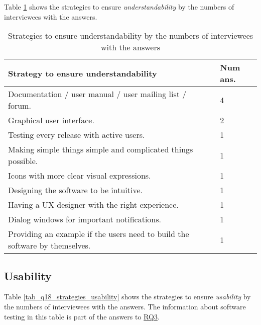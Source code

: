 Table \ref{tab_q17_strategies_understandability} shows the strategies to ensure \textit{understandability} by the numbers of interviewees with the answers.

\begin{table}[H]
\centering
\begin{tabular}{ll}
\hline
Strategy to ensure understandability & Num ans. \\ \hline
Documentation / user manual / user mailing list / forum. & 4 \\
Graphical user interface. & 2 \\
Testing every release with active users. & 1 \\
Making simple things simple and complicated things possible. & 1 \\
Icons with more clear visual expressions. & 1 \\
Designing the software to be intuitive. & 1 \\
Having a UX designer with the right experience. & 1 \\
Dialog windows for important notifications. & 1 \\
Providing an example if the users need to build the software by themselves. & 1 \\ \hline
\end{tabular}
\caption{\label{tab_q17_strategies_understandability}Strategies to ensure understandability by the numbers of interviewees with the answers}
\end{table}

\subsection{Usability}
\label{sec_interview_usability}

Table \ref{tab_q18_strategies_usability} shows the strategies to ensure \textit{usability} by the numbers of interviewees with the answers. The information about software testing in this table is part of the answers to \hyperlink{rq3}{RQ3}.

